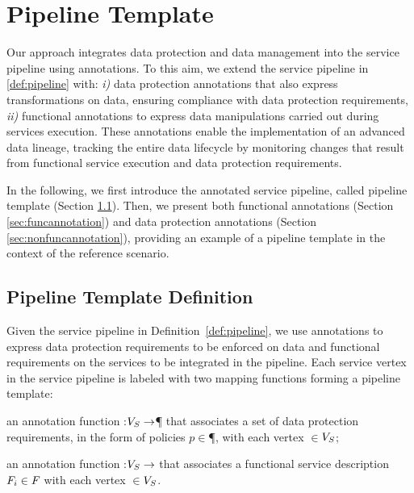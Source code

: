 \section{Pipeline Template}\label{sec:template}
Our approach integrates data protection and data management into the service pipeline using annotations.
To this aim, we extend the service pipeline in \cref{def:pipeline} with: \emph{i)} data protection annotations that also express transformations on data, ensuring compliance with data protection requirements, \emph{ii)} functional annotations to express data manipulations carried out during services execution.
These annotations enable the implementation of an advanced data lineage, tracking the entire data lifecycle by monitoring changes that result from functional service execution and data protection requirements.

In the following, we first introduce the annotated service pipeline, called pipeline template (Section \ref{sec:templatedefinition}). Then, we present both functional annotations (Section \ref{sec:funcannotation}) and data protection annotations (Section \ref{sec:nonfuncannotation}), providing an example of a pipeline template in the context of the reference scenario.


\subsection{Pipeline Template Definition}\label{sec:templatedefinition}
Given the service pipeline in Definition~\ref{def:pipeline}, we use annotations to express data protection requirements to be enforced on data and functional requirements on the services to be integrated in the pipeline. Each service vertex in the service pipeline is labeled with two mapping functions forming a pipeline template:
\begin{enumerate*}[label=\textit{\roman*})]
  \item an annotation function \myLambda:$V_S\rightarrow$\P{} that associates a set of data protection requirements, in the form of policies $p$$\in$\P{}, with each vertex $\in$$V_S$;
  \item an annotation function \myGamma:$V_S\rightarrow$\F{} that associates a functional service description $F_i\in F_{}$ with each vertex $\in$$V_S$.
\end{enumerate*}

